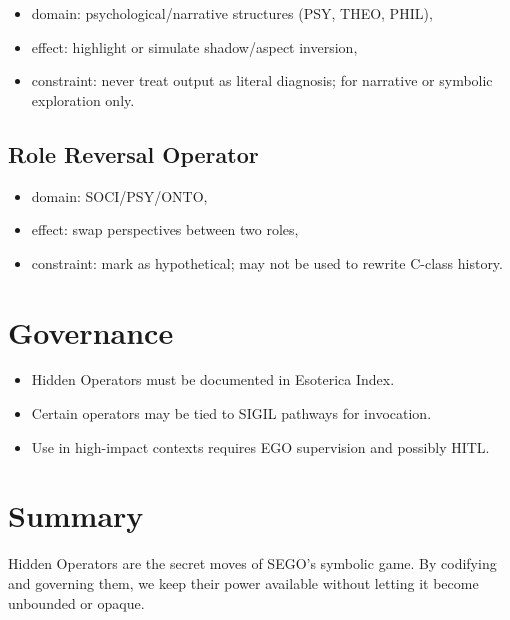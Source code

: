 \begin{itemize}
    \item domain: psychological/narrative structures (PSY, THEO, PHIL),
    \item effect: highlight or simulate shadow/aspect inversion,
    \item constraint: never treat output as literal diagnosis; for narrative
          or symbolic exploration only.
\end{itemize}

\subsection{Role Reversal Operator}

\begin{itemize}
    \item domain: SOCI/PSY/ONTO,
    \item effect: swap perspectives between two roles,
    \item constraint: mark as hypothetical; may not be used to rewrite
          C-class history.
\end{itemize}

\section{Governance}

\begin{itemize}
    \item Hidden Operators must be documented in Esoterica Index.
    \item Certain operators may be tied to SIGIL pathways for invocation.
    \item Use in high-impact contexts requires EGO supervision and possibly HITL.
\end{itemize}

\section{Summary}

Hidden Operators are the secret moves of SEGO’s symbolic game. By codifying
and governing them, we keep their power available without letting it become
unbounded or opaque.
